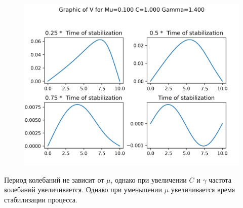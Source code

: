 \begin{figure}[H]
	\includegraphics[scale=0.5]{../graphs_data_nonsmooth_2/slices/Graph_V_mu0.100_C1.000_gamma1.400.png}
\end{figure}

Период колебаний не зависит от $\mu$, однако при увеличении $C$ и $\gamma$ частота колебаний увеличивается. Однако при уменьшении $\mu$ увеличивается время стабилизации процесса.


